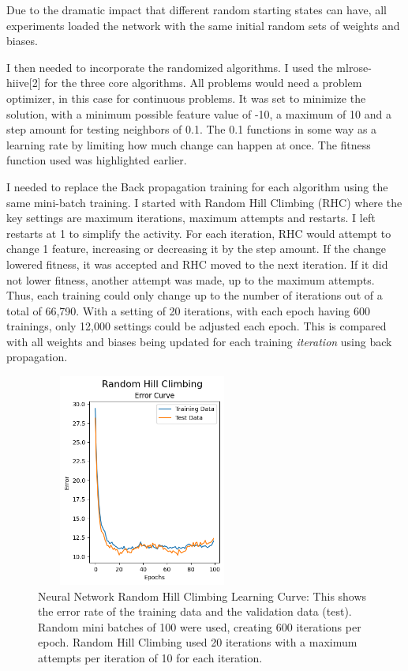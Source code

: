 \documentclass[letterpaper]{article} %
\begin{document}
Due to the dramatic impact that different random starting states can have, all experiments loaded the network with the same initial random sets of weights and biases.

I then needed to incorporate the randomized algorithms. I used the mlrose-hiive[2] for the three core algorithms.  All problems would need a problem optimizer, in this case for continuous problems. It was set to minimize the solution, with a minimum possible feature value of -10, a maximum of 10 and a step amount for testing neighbors of 0.1.  The 0.1 functions in some way as a learning rate by limiting how much change can happen at once.  The fitness function used was highlighted earlier.

I needed to replace the Back propagation training for each algorithm using the same mini-batch training. I started with Random Hill Climbing (RHC) where the key settings are maximum iterations, maximum attempts and restarts.  I left restarts at 1 to simplify the activity.  For each iteration, RHC would attempt to change 1 feature, increasing or decreasing it by the step amount.  If the change lowered fitness, it was accepted and RHC moved to the next iteration.  If it did not lower fitness, another attempt was made, up to the maximum attempts.  Thus, each training could only change up to the number of iterations out of a total of 66,790.  With a setting of 20 iterations, with each epoch having 600 trainings, only 12,000 settings could be adjusted each epoch.  This is compared with all weights and biases being updated for each training \emph{iteration} using back propagation.

\begin{figure}[!htb]
\centering
\includegraphics[width=2.75in, height=2.75in]{figures/Random_Hill_Climbing__algorithm_rhc_epochs_100_restart_1_max_iters_20_max_attempts_10_seed_1_capture_iteration_values_False_Error_Curve.png}
\caption{Neural Network Random Hill Climbing Learning Curve: This shows the error rate of the training data and the validation data (test).  Random mini batches of 100 were used, creating 600 iterations per epoch.  Random Hill Climbing used 20 iterations with a maximum attempts per iteration of 10 for each iteration.  }
\label{fig:nn_rhc_initial}
\end{figure}
\end{document}
